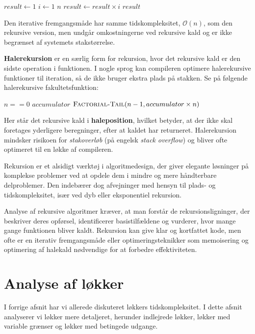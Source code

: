 \begin{codebox}
    \li $result \gets 1$
    \li \For $i \gets 1$ \To $n$ \Do
    \li     $result \gets result \times i$
        \End
    \li \Return $result$
\end{codebox}

Den iterative fremgangsmåde har samme tidskompleksitet, $\mathcal{O}(n)$, som den rekursive version, men undgår omkostningerne ved rekursive kald og er ikke begrænset af systemets stakstørrelse.

\textbf{Halerekursion} er en særlig form for rekursion, hvor det rekursive kald er den sidste operation i funktionen. I nogle sprog kan compileren optimere halerekursive funktioner til iteration, så de ikke bruger ekstra plads på stakken. Se på følgende halerekursive fakultetsfunktion:

\begin{codebox}
    \li \If $n == 0$ \Then
    \li     \Return $accumulator$
        \End
    \li \Return $\proc{Factorial-Tail}(n-1, accumulator \times n)$
\end{codebox}

Her står det rekursive kald i \textbf{haleposition}, hvilket betyder, at der ikke skal foretages yderligere beregninger, efter at kaldet har returneret. Halerekursion mindsker risikoen for \textit{stakoverløb} (på engelsk \emph{stack overflow}) og bliver ofte optimeret til en løkke af compileren.

Rekursion er et alsidigt værktøj i algoritmedesign, der giver elegante løsninger på komplekse problemer ved at opdele dem i mindre og mere håndterbare delproblemer. Den indebærer dog afvejninger med hensyn til plads- og tidskompleksitet, især ved dyb eller eksponentiel rekursion.

Analyse af rekursive algoritmer kræver, at man forstår de rekursionsligninger, der beskriver deres opførsel, identificerer basistilfældene og vurderer, hvor mange gange funktionen bliver kaldt. Rekursion kan give klar og kortfattet kode, men ofte er en iterativ fremgangsmåde eller optimeringsteknikker som memoisering og optimering af halekald nødvendige for at forbedre effektiviteten.

\section{Analyse af løkker}\label{sec:loop-analysis}
I forrige afsnit har vi allerede diskuteret løkkers tidskompleksitet. I dette afsnit analyserer vi løkker mere detaljeret, herunder indlejrede løkker, løkker med variable grænser og løkker med betingede udgange.

